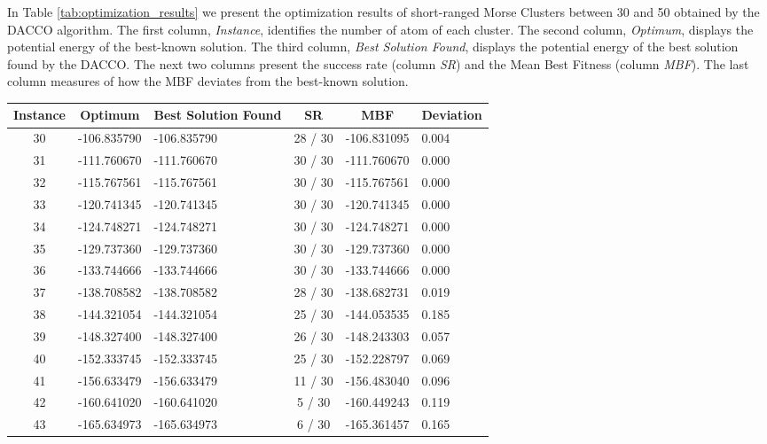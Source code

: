 	In Table \ref{tab:optimization_results} we present the optimization results of short-ranged Morse Clusters between 30 and 50 obtained by the DACCO algorithm. The first column, \emph{Instance}, identifies the number of atom of each cluster. The second column, \emph{Optimum}, displays the potential energy of the best-known solution. The third column, \emph{Best Solution Found}, displays the potential energy of the best solution found by the DACCO. The next two columns present the success rate (column \emph{SR}) and the Mean Best Fitness (column \emph{MBF}). The last column measures of how the MBF deviates from the best-known solution.
	\begin{table}[!htbp]
		\begin{center}
			\begin{tabular}{| c | c | p{3cm} | c | c | p{2cm} |}
				\hline
				\textbf{Instance} & \textbf{Optimum} & \textbf{Best Solution Found} & \textbf{SR} & \textbf{MBF} & \textbf{Deviation}\\ \hline
				30 & -106.835790 & -106.835790 & 28 / 30 & -106.831095 & 0.004 \\ \hline
				31 & -111.760670 & -111.760670 & 30 / 30 & -111.760670 & 0.000 \\ \hline
				32 & -115.767561 & -115.767561 & 30 / 30 & -115.767561 & 0.000 \\ \hline
				33 & -120.741345 & -120.741345 & 30 / 30 & -120.741345 & 0.000 \\ \hline
				34 & -124.748271 & -124.748271 & 30 / 30 & -124.748271 & 0.000 \\ \hline
				35 & -129.737360 & -129.737360 & 30 / 30 & -129.737360 & 0.000 \\ \hline
				36 & -133.744666 & -133.744666 & 30 / 30 & -133.744666 & 0.000 \\ \hline
				37 & -138.708582 & -138.708582 & 28 / 30 & -138.682731 & 0.019 \\ \hline
				38 & -144.321054 & -144.321054 & 25 / 30 & -144.053535 & 0.185 \\ \hline
				39 & -148.327400 & -148.327400 & 26 / 30 & -148.243303 & 0.057 \\ \hline
				40 & -152.333745 & -152.333745 & 25 / 30 & -152.228797 & 0.069 \\ \hline
				41 & -156.633479 & -156.633479 & 11 / 30 & -156.483040 & 0.096 \\ \hline
				42 & -160.641020 & -160.641020 & 5 / 30 & -160.449243 & 0.119 \\ \hline
				43 & -165.634973 & -165.634973 & 6 / 30 & -165.361457 & 0.165 \\ \hline

\end{tabular}
\end{center}
\end{table}
